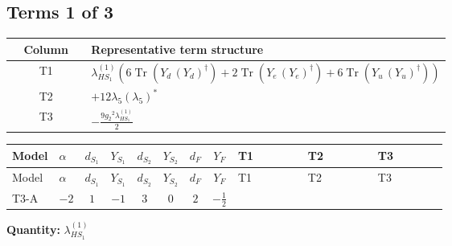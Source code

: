 \documentclass[8pt]{article}
\begin{document}
\begin{landscape}
\subsection*{Terms 1 of 3}
\begin{center}
\begin{tabular}{@{}c >{\raggedright\arraybackslash}p{0.82\linewidth}@{}}
\toprule
Column & Representative term structure \\
\midrule
T1 & \(\displaystyle {\lambda_{HS_1}^{(1)}} (6 \operatorname{Tr}\!\left({Y_d}\,\left({Y_d}\right)^{\dagger}\right)+2 \operatorname{Tr}\!\left({Y_e}\,\left({Y_e}\right)^{\dagger}\right)+6 \operatorname{Tr}\!\left({Y_u}\,\left({Y_u}\right)^{\dagger}\right))\) \\
\midrule
T2 & \(\displaystyle +12 {\lambda_5} \left({\lambda_5}\right)^{*}\) \\
\midrule
T3 & \(\displaystyle -\frac{9 {g_2}^2 {\lambda_{HS_1}^{(1)}}}{2}\) \\
\midrule
\bottomrule
\end{tabular}
\end{center}
\smallskip
\tiny
\begin{longtable}{@{}llcccccc >{\raggedright\arraybackslash}p{0.21\linewidth} >{\raggedright\arraybackslash}p{0.21\linewidth} >{\raggedright\arraybackslash}p{0.21\linewidth}@{}}
\toprule
Model & $\alpha$ & $d_{S_1}$ & $Y_{S_1}$ & $d_{S_2}$ & $Y_{S_2}$ & $d_F$ & $Y_F$ & T1 & T2 & T3 \\
\midrule
\endfirsthead
\toprule
Model & $\alpha$ & $d_{S_1}$ & $Y_{S_1}$ & $d_{S_2}$ & $Y_{S_2}$ & $d_F$ & $Y_F$ & T1 & T2 & T3 \\
\midrule
\endhead
T3-A & $-2$ & $1$ & $-1$ & $3$ & $0$ & $2$ & $-\frac{1}{2}$ & \scriptsize\adjustbox{max width=\linewidth}{$\begin{gathered} {\lambda_{HS_1}^{(1)}} (6 \operatorname{Tr}\!\left({Y_d}\,\left({Y_d}\right)^{\dagger}\right)+2 \operatorname{Tr}\!\left({Y_e}\,\left({Y_e}\right)^{\dagger}\right)+6 \operatorname{Tr}\!\left({Y_u}\,\left({Y_u}\right)^{\dagger}\right))\end{gathered}$} & \scriptsize\adjustbox{max width=\linewidth}{$\begin{gathered} +12 {\lambda_5} \left({\lambda_5}\right)^{*}\end{gathered}$} & \scriptsize\adjustbox{max width=\linewidth}{$\begin{gathered} -\frac{9 {g_2}^2 {\lambda_{HS_1}^{(1)}}}{2}\end{gathered}$} \\
\midrule
\bottomrule
\end{longtable}
\clearpage
\noindent\textbf{Quantity: }$\lambda_{HS_1}^{(1)}$\par\smallskip

\end{landscape}
\end{document}
